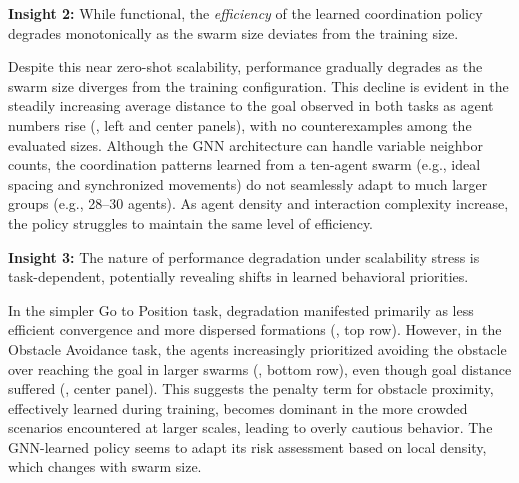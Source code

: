\begin{tcolorbox}[colback=insightgray, colframe=black!20!white, boxrule=0.5pt, arc=1mm, boxsep=1pt, left=2pt, right=2pt, top=2pt, bottom=2pt]
	\textbf{Insight 2:} While functional, the \emph{efficiency} of the learned coordination policy degrades 
monotonically as the swarm size deviates from the training size.
\end{tcolorbox}
Despite this near zero-shot scalability, 
 performance gradually degrades as the swarm size diverges from the training configuration. 
%
This decline is evident in the steadily increasing average distance to the goal observed 
 in both tasks as agent numbers rise (, left and center panels), 
 with no counterexamples among the evaluated sizes.
% 
Although the GNN architecture can handle variable neighbor counts, 
 the coordination patterns learned from a ten-agent swarm (e.g., ideal spacing and synchronized movements) 
 do not seamlessly adapt to much larger groups (e.g., 28--30 agents). 
% 
As agent density and interaction complexity increase, 
 the policy struggles to maintain the same level of efficiency.

\begin{tcolorbox}[colback=insightgray, colframe=black!20!white, boxrule=0.5pt, arc=1mm, boxsep=1pt, left=2pt, right=2pt, top=2pt, bottom=2pt]
	\textbf{Insight 3:} The nature of performance degradation under scalability stress is task-dependent, 
potentially revealing shifts in learned behavioral priorities.
\end{tcolorbox}
In the simpler Go to Position task, 
 degradation manifested primarily as less efficient convergence and more dispersed formations 
 (, top row). 
%
However, 
 in the Obstacle Avoidance task, 
 the agents increasingly prioritized avoiding the obstacle over reaching the goal 
 in larger swarms (, bottom row), 
 even though goal distance suffered (, center panel). 
%
This suggests the penalty term for obstacle proximity, 
 effectively learned during training, 
 becomes dominant in the more crowded scenarios encountered at larger scales, leading to overly cautious behavior. 
 The GNN-learned policy seems to adapt its risk assessment 
 based on local density, which changes with swarm size.


